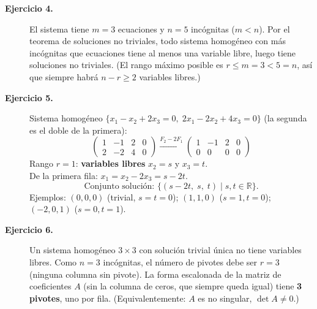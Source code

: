 \documentclass[11pt,letterpaper]{article}
\theoremstyle{definition}
\theoremstyle{plain}
\begin{document}
\begin{description}
\item[\textbf{Ejercicio 4.}]
El sistema tiene $m=3$ ecuaciones y $n=5$ incógnitas ($m < n$). Por el teorema de soluciones no
triviales, todo sistema homogéneo con más incógnitas que ecuaciones tiene al menos una variable
libre, luego tiene soluciones no triviales. (El rango máximo posible es $r\leq m=3 < 5=n$, así que
siempre habrá $n-r\geq 2$ variables libres.)

\item[\textbf{Ejercicio 5.}]
Sistema homogéneo $\{x_1-x_2+2x_3=0,\;2x_1-2x_2+4x_3=0\}$ (la segunda es el doble de la
primera):
\[
  \left(\begin{array}{ccc|c}1&-1&2&0\\2&-2&4&0\end{array}\right)
  \xrightarrow{F_2-2F_1}
  \left(\begin{array}{ccc|c}1&-1&2&0\\0&0&0&0\end{array}\right)
\]
Rango $r=1$: \textbf{variables libres} $x_2=s$ y $x_3=t$.\\
De la primera fila: $x_1 = x_2 - 2x_3 = s - 2t$.
\[\boxed{\text{Conjunto solución: }\{(s-2t,\;s,\;t)\mid s,t\in\mathbb{R}\}.}\]
Ejemplos: $(0,0,0)$ (trivial, $s=t=0$);\; $(1,1,0)$ ($s=1, t=0$);\; $(-2,0,1)$ ($s=0,t=1$).

\item[\textbf{Ejercicio 6.}]
Un sistema homogéneo $3\times 3$ con solución trivial única no tiene variables libres. Como
$n=3$ incógnitas, el número de pivotes debe ser $r=3$ (ninguna columna sin pivote). La forma
escalonada de la matriz de coeficientes $A$ (sin la columna de ceros, que siempre queda igual)
tiene \textbf{3 pivotes}, uno por fila. (Equivalentemente: $A$ es no singular, $\det A\neq 0$.)

\end{description}
\end{document}
